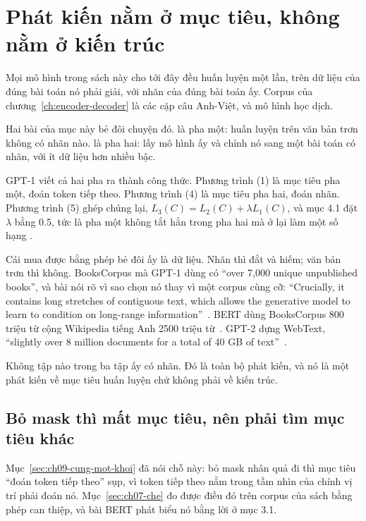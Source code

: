 \section{Phát kiến nằm ở mục tiêu, không nằm ở kiến trúc}
\label{sec:ch09-phat-kien}

%
Mọi mô hình trong sách này cho tới đây đều huấn luyện một lần, trên dữ liệu của
đúng bài toán nó phải giải, với nhãn của đúng bài toán ấy. Corpus của
chương~\ref{ch:encoder-decoder} là các cặp câu Anh-Việt, và mô hình học dịch.

Hai bài của mục này bẻ đôi chuyện đó.  là pha
một: huấn luyện trên văn bản trơn không có nhãn nào.  là pha hai: lấy mô hình ấy và chỉnh nó sang một bài toán có
nhãn, với ít dữ liệu hơn nhiều bậc.

GPT-1 viết cả hai pha ra thành công thức. Phương trình (1) là mục tiêu pha một,
đoán token tiếp theo. Phương trình (4) là mục tiêu pha hai, đoán nhãn. Phương
trình (5) ghép chúng lại, \(L_3(C) = L_2(C) + \lambda L_1(C)\), và mục 4.1 đặt
\(\lambda\) bằng 0.5, tức là pha một không tắt hẳn trong pha hai mà ở lại làm
một số hạng .

Cái mua được bằng phép bẻ đôi ấy là dữ liệu. Nhãn thì đắt và hiếm; văn bản trơn
thì không. BooksCorpus mà GPT-1 dùng có \enquote{over 7,000 unique unpublished
books}, và bài nói rõ vì sao chọn nó thay vì một corpus cùng cỡ:
\enquote{Crucially, it contains long stretches of contiguous text, which allows
the generative model to learn to condition on long-range
information}~\autocite{radford2018gpt1}. BERT dùng BooksCorpus 800 triệu từ cộng
Wikipedia tiếng Anh 2500 triệu từ~\autocite{devlin2019bert}. GPT-2 dựng WebText,
\enquote{slightly over 8 million documents for a total of 40 GB of
text}~\autocite{radford2019gpt2}.

Không tập nào trong ba tập ấy có nhãn. Đó là toàn bộ phát kiến, và nó là một
phát kiến về mục tiêu huấn luyện chứ không phải về kiến trúc.

\subsection*{Bỏ mask thì mất mục tiêu, nên phải tìm mục tiêu khác}

%
Mục~\ref{sec:ch09-cung-mot-khoi} đã nói chỗ này: bỏ mask nhân quả đi thì mục
tiêu \enquote{đoán token tiếp theo} sụp, vì token tiếp theo nằm trong tầm nhìn
của chính vị trí phải đoán nó. Mục~\ref{sec:ch07-che} đo được điều đó trên
corpus của sách bằng phép can thiệp, và bài BERT phát biểu nó bằng lời ở mục
3.1.

